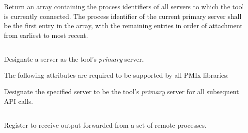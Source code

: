 {\returnsimple

\descr

Return an array containing the  process identifiers of all servers to which the tool is currently connected. The process identifier of the current primary server shall be the first entry in the array, with the remaining entries in order of attachment from earliest to most recent.


\subsection{}

\summary

Designate a server as the tool's \emph{primary} server.

\format


\begin{arglist}
\end{arglist}

\returnsimple

\reqattrstart
The following attributes are required to be supported by all \ac{PMIx} libraries:


\reqattrend

\descr

Designate the specified server to be the tool's \emph{primary} server for all subsequent \ac{API} calls.


\subsection{}

\summary

Register to receive output forwarded from a set of remote processes.

}
